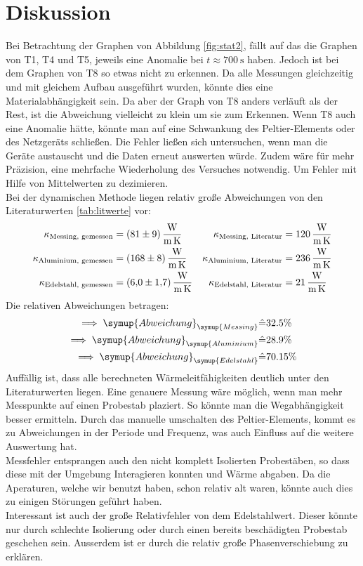 \section{Diskussion}
\label{sec:Diskussion}
Bei Betrachtung der Graphen von Abbildung \eqref{fig:stat2}, fällt auf das die Graphen von T1, T4 und T5, jeweils eine Anomalie bei $t \approx \SI{700}{\second}$ haben.
Jedoch ist bei dem Graphen von T8 so etwas nicht zu erkennen. Da alle Messungen gleichzeitig und mit gleichem Aufbau ausgeführt wurden, 
könnte dies eine Materialabhängigkeit sein. Da aber der Graph von T8 anders verläuft als der Rest, ist die Abweichung vielleicht zu klein um sie zum Erkennen.
Wenn T8 auch eine Anomalie hätte, könnte man auf eine Schwankung des Peltier-Elements oder des Netzgeräts schließen.
Die Fehler ließen sich untersuchen, wenn man die Geräte austauscht und die Daten erneut auswerten würde. 
Zudem wäre für mehr Präzision, eine mehrfache Wiederholung des Versuches notwendig. Um Fehler mit Hilfe von Mittelwerten zu dezimieren.
\\
Bei der dynamischen Methode liegen relativ große Abweichungen von den Literaturwerten \ref{tab:litwerte} vor:
\begin{align*}
    \kappa_\text{Messing, gemessen} &= \SI{81 \pm 9}{\watt\per\metre\per\kelvin} & \kappa_\text{Messing, Literatur} &= \SI{120}{\watt\per\metre\per\kelvin}\\
    \kappa_\text{Aluminium, gemessen} &= \SI{168 \pm 8}{\watt\per\metre\per\kelvin} & \kappa_\text{Aluminium, Literatur} &= \SI{236}{\watt\per\metre\per\kelvin}\\
    \kappa_\text{Edelstahl, gemessen} &= \SI{6 \pm 1.7}{\watt\per\metre\per\kelvin} & \kappa_\text{Edelstahl, Literatur} &= \SI{21}{\watt\per\metre\per\kelvin}
\end{align*}
Die relativen Abweichungen betragen:
\begin{align*}
    \implies \symup{Abweichung}_{\symup{Messing}} &\hat{=} 32.5 \%\\
    \implies \symup{Abweichung}_{\symup{Aluminium}} &\hat{=} 28.9\%\\
    \implies \symup{Abweichung}_{\symup{Edelstahl}} &\hat{=} 70.15 \%
\end{align*}
Auffällig ist, dass alle berechneten Wärmeleitfähigkeiten deutlich unter den Literaturwerten liegen.
Eine genauere Messung wäre möglich, wenn man mehr Messpunkte auf einen Probestab plaziert. So könnte man die Wegabhängigkeit besser ermitteln.
Durch das manuelle umschalten des Peltier-Elements, kommt es zu Abweichungen in der Periode und Frequenz, was auch Einfluss auf die weitere Auswertung hat.
\\
Messfehler entsprangen auch den nicht komplett Isolierten Probestäben, so dass diese mit der Umgebung Interagieren konnten und Wärme abgaben.
Da die Aperaturen, welche wir benutzt haben, schon relativ alt waren, könnte auch dies zu einigen Störungen geführt haben.
\\
Interessant ist auch der große Relativfehler von dem Edelstahlwert. Dieser könnte nur durch schlechte Isolierung oder durch einen bereits beschädigten Probestab geschehen sein.
Ausserdem ist er durch die relativ große Phasenverschiebung zu erklären. 

